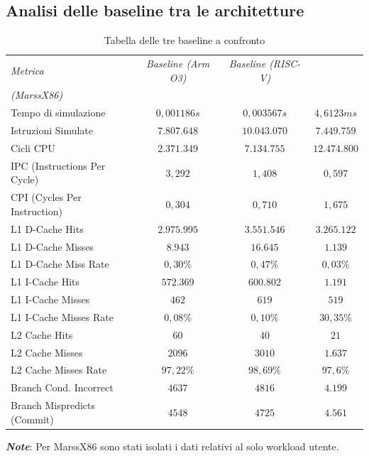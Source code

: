 \documentclass[../../main_document/main.tex]{subfiles}
\begin{document}
\subsection{Analisi delle baseline tra le architetture}
\begin{table}[tbh]
    \begin{center}
        \begin{tabular}{|l|c|c|c|}
            \hline
                \textit{Metrica} & 
                \textit{Baseline (Arm O3)} & 
                \textit{Baseline (RISC-V)} & 
                \makecell{\textit{Baseline user}\\\textit{(MarssX86)}} \\

            \hline
            Tempo di simulazione & $0,001186 s$ & $0,003567 s$ & $4,6123 ms$ \\
            Istruzioni Simulate & $7.807.648$ & $10.043.070$ & $7.449.759$ \\
            Cicli CPU & $2.371.349$ & $7.134.755$ & $12.474.800$\\
            IPC (Instructions Per Cycle) & $3,292$ & $1,408$ & $0,597$ \\
            CPI (Cycles Per Instruction) & $0,304$ & $0,710$ & $1,675$ \\
            L1 D-Cache Hits & $2.975.995$ & $3.551.546$ & $3.265.122$  \\
            L1 D-Cache Misses & $8.943$ & $16.645$ & $1.139$ \\
            L1 D-Cache Miss Rate & $0,30\%$ & $0,47\%$ & $0,03\%$ \\
            L1 I-Cache Hits & $572.369$ & $600.802$ & $1.191$ \\
            L1 I-Cache Misses & $462$ & $619$ & $519$ \\
            L1 I-Cache Misses Rate & $0,08\%$ & $0,10\%$ & $30,35\%$\\
            L2 Cache Hits & $60$ & $40$ & $21$ \\ 
            L2 Cache Misses & $2096$ & $3010$ & $1.637$ \\
            L2 Cache Misses Rate & $97,22\%$ & $98,69\%$ & $97,6\%$ \\
            Branch Cond. Incorrect & $4637$ & $4816$ & $4.199$ \\
            Branch Mispredicts (Commit) & $4548$ & $4725$ & $4.561$ \\
            \hline
        \end{tabular}
        \caption{Tabella delle tre baseline a confronto}

        \vspace{8pt}
        \textbf{\textit{Note}}: Per MarssX86 sono stati isolati i dati relativi al solo workload utente.
        \label{tab: tab_5}
    \end{center}
\end{table}
\end{document}
